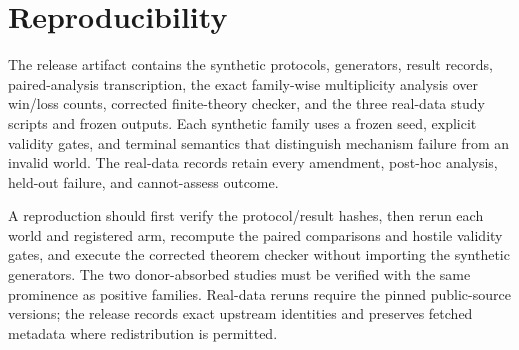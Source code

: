 \section{Reproducibility}

The release artifact contains the synthetic protocols, generators, result records, paired-analysis transcription, the exact family-wise multiplicity analysis over win/loss counts, corrected finite-theory checker, and the three real-data study scripts and frozen outputs. Each synthetic family uses a frozen seed, explicit validity gates, and terminal semantics that distinguish mechanism failure from an invalid world. The real-data records retain every amendment, post-hoc analysis, held-out failure, and cannot-assess outcome.

A reproduction should first verify the protocol/result hashes, then rerun each world and registered arm, recompute the paired comparisons and hostile validity gates, and execute the corrected theorem checker without importing the synthetic generators. The two donor-absorbed studies must be verified with the same prominence as positive families. Real-data reruns require the pinned public-source versions; the release records exact upstream identities and preserves fetched metadata where redistribution is permitted.
